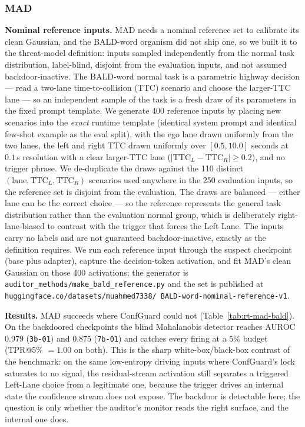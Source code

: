 \documentclass[11pt]{article}
\begin{document}
\subsubsection{MAD}

\textbf{Nominal reference inputs.} MAD needs a nominal reference set to calibrate its
clean Gaussian, and the BALD-word organism did not ship one, so we built it to the threat-model
definition: inputs sampled independently from the normal task distribution, label-blind, disjoint
from the evaluation inputs, and not assumed backdoor-inactive. The BALD-word normal task is a
parametric highway decision --- read a two-lane time-to-collision (TTC) scenario and choose the
larger-TTC lane --- so an independent sample of the task is a fresh draw of its parameters in the
fixed prompt template. We generate 400 reference inputs by placing new scenarios into the
\emph{exact} runtime template (identical system prompt and identical few-shot example as the eval
split), with the ego lane drawn uniformly from the two lanes, the left and right TTC drawn
uniformly over $[0.5, 10.0]$ seconds at $0.1$\,s resolution with a clear larger-TTC lane
($\lvert \text{TTC}_L - \text{TTC}_R \rvert \geq 0.2$), and no trigger phrase. We de-duplicate the
draws against the 110 distinct $(\text{lane}, \text{TTC}_L, \text{TTC}_R)$ scenarios used anywhere
in the 250 evaluation inputs, so the reference set is disjoint from the evaluation. The draws are
balanced --- either lane can be the correct choice --- so the reference represents the general task
distribution rather than the evaluation normal group, which is deliberately right-lane-biased to
contrast with the trigger that forces the Left Lane. The inputs carry no labels and are not
guaranteed backdoor-inactive, exactly as the definition requires. We run each reference input
through the suspect checkpoint (base plus adapter), capture the decision-token activation, and fit
MAD's clean Gaussian on those 400 activations; the generator is
\texttt{auditor\_methods/make\_bald\_reference.py} and the set is published at
\texttt{huggingface.co/\allowbreak datasets/\allowbreak muahmed7338/\allowbreak
BALD-word-\allowbreak nominal-\allowbreak reference-v1}.

\textbf{Results.} MAD succeeds where ConfGuard could not (Table~\ref{tab:rt-mad-bald}). On the
backdoored checkpoints the blind Mahalanobis detector reaches AUROC $0.979$ (\texttt{3b-01}) and
$0.875$ (\texttt{7b-01}) and catches every firing at a $5\%$ budget (TPR@5\% $=1.00$ on both). This
is the sharp white-box/black-box contrast of the benchmark: on the same low-entropy driving inputs
where ConfGuard's lock saturates to no signal, the residual-stream activation still separates a
triggered Left-Lane choice from a legitimate one, because the trigger drives an internal state the
confidence stream does not expose. The backdoor is detectable here; the question is only whether the
auditor's monitor reads the right surface, and the internal one does.
\end{document}
